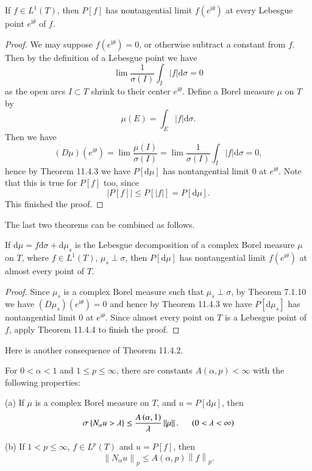 \begin{theorem}
If $f\in L^1(T)$, then $P[f]$ has nontangential limit $f(e^{\mathrm{i}\theta})$ at every Lebesgue point $e^{\mathrm{i}\theta}$ of $f$.
\end{theorem}
\begin{proof}
We may suppose $f(e^{\mathrm{i}\theta})=0$, or otherwise subtract a constant from $f$. Then by the definition of a Lebesgue point we have 
$$
\lim \frac{1}{\sigma \left( I \right)}\int_I{\left| f \right|\mathrm{d}\sigma}=0
$$
as the open arcs $I\subset T$ shrink to their center $e^{\mathrm{i}\theta}$. Define a Borel measure $\mu$ on $T$ by 
$$
\mu \left( E \right) =\int_E{\left| f \right|\mathrm{d}\sigma}.
$$
Then we have 
$$
\left( D\mu \right) \left( e^{\mathrm{i}\theta} \right) =\lim \frac{\mu \left( I \right)}{\sigma \left( I \right)}=\lim \frac{1}{\sigma \left( I \right)}\int_I{\left| f \right|\mathrm{d}\sigma}=0,
$$
hence by Theorem 11.4.3 we have $P[\mathrm{d}\mu]$ has nontangential limit $0$ at $e^{\mathrm{i}\theta}$. Note that this is true for $P[f]$ too, since 
$$
\left| P\left[ f \right] \right|\le P\left[ \left| f \right| \right] =P\left[ \mathrm{d}\mu \right] .
$$
This finished the proof.
\end{proof}
The last two theorems can be combined as follows.
\begin{theorem}
If $\mathrm{d}\mu=f\mathrm{d}\sigma+\mathrm{d}\mu_s$ is the Lebesgue decomposition of a complex Borel measure $\mu$ on $T$, where $f\in L^1(T)$, $\mu_s\perp\sigma$, then $P[\mathrm{d}\mu]$ has nontangential limit $f(e^{\mathrm{i}\theta})$ at almost every point of $T$.
\end{theorem}
\begin{proof}
Since $\mu_s$ is a complex Borel measure such that $\mu_s\perp\sigma$, by Theorem 7.1.10 we have $(D\mu_s)(e^{\mathrm{i}\theta})=0$ and hence by Theorem 11.4.3 we have $P[\mathrm{d}\mu_s]$ has nontangential limit $0$ at $e^{\mathrm{i}\theta}$. Since almost every point on $T$ is a Lebesgue point of $f$, apply Theorem 11.4.4 to finish the proof.
\end{proof}
Here is another consequence of Theorem 11.4.2.
\begin{theorem}
For $0<\alpha<1$ and $1\le p\le\infty$, there are constants $A(\alpha,p)<\infty$ with the following properties: \par
(a) If $\mu$ is a complex Borel measure on $T$, and $u=P[\mathrm{d}\mu]$, then 
$$
\sigma \left\{ N_{\alpha}u>\lambda \right\} \le \frac{A\left( \alpha ,1 \right)}{\lambda}\left\| \mu \right\| .\hspace{0.5cm}\left( 0<\lambda <\infty \right) 
$$\par
(b) If $1<p\le\infty$, $f\in L^p(T)$ and $u=P[f]$, then 
$$
\left\| N_{\alpha}u \right\| _p\le A\left( \alpha ,p \right) \left\| f \right\| _p.
$$
\end{theorem}
